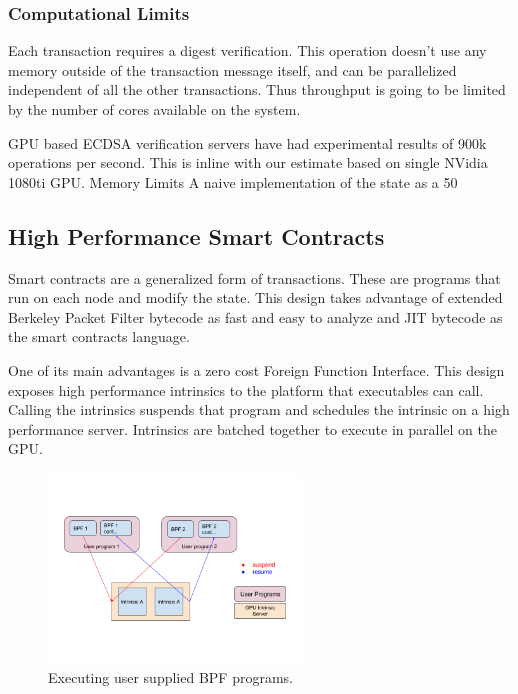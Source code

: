 \documentclass[12pt]{article}
\begin{document}
\subsubsection{Computational Limits}
Each transaction requires a digest verification.  This operation doesn’t use any memory outside of the transaction message itself, and can be parallelized independent of all the other transactions.  Thus throughput is going to be limited by the number of cores available on the system.

GPU based ECDSA verification servers have had experimental results of 900k operations per second.  This is inline with our estimate based on single NVidia 1080ti GPU. 
Memory Limits
A naive implementation of the state as a 50%

\subsection{High Performance Smart Contracts}

Smart contracts are a generalized form of transactions.  These are programs that run on each node and modify the state.  This design takes advantage of extended Berkeley Packet Filter bytecode as fast and easy to analyze and JIT bytecode as the smart contracts language.

One of its main advantages is a zero cost Foreign Function Interface. This design exposes high performance intrinsics to the platform that executables can call.  Calling the intrinsics suspends that program and schedules the intrinsic on a high performance server.  Intrinsics are batched together to execute in parallel on the GPU.

\begin{figure}
  \begin{center}
    \centering
    \includegraphics[width=0.6\textwidth]{figures/fig_11.png}
    \caption[Fig 11]{Executing user supplied BPF programs.\label{fig_11}}
  \end{center}
  \end{figure}
\end{document}
